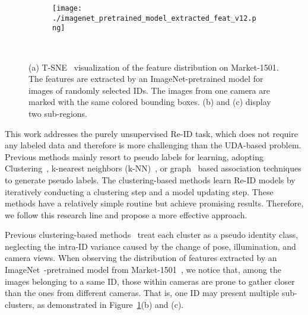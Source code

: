 \documentclass[letterpaper]{article} \usepackage{aaai21}  \usepackage{times}  \usepackage{helvet} \usepackage{courier}  \usepackage[hyphens]{url}  \usepackage{graphicx} \usepackage{subcaption}
\begin{document}
\begin{figure}[t]
\centering
\begin{subfigure}{0.36\textwidth}
\centering
\texttt{[image: ./imagenet\_pretrained\_model\_extracted\_feat\_v12.png]} 
\caption{}
\end{subfigure}
\\
\begin{subfigure}{0.144\textwidth}
\centering
{}
\caption{}
\end{subfigure}
\quad
\begin{subfigure}{0.117\textwidth}
\centering
{}
\caption{}
\end{subfigure}
\caption{(a) T-SNE~\cite{vanDerMaaten2008} visualization of the feature distribution on Market-1501. The features are extracted by an ImageNet-pretrained model for images of  randomly selected IDs. The images from one camera are marked with the same colored bounding boxes. (b) and (c) display two sub-regions.}
\label{fig_intro}
\end{figure}


This work addresses the purely unsupervised Re-ID task, which does not require any labeled data and therefore is more challenging than the UDA-based problem. Previous methods mainly resort to pseudo labels for learning, adopting Clustering~\cite{lin2019aBottom,zeng2020hierarchical}, k-nearest neighbors (k-NN)~\cite{li2018unsupervised,chen2018deepa}, or graph~\cite{ye2017dynamic,wu2019graph} based association techniques to generate pseudo labels. The clustering-based methods learn Re-ID models by iteratively conducting a clustering step and a model updating step. These methods have a relatively simple routine but achieve promising results. Therefore, we follow this research line and propose a more effective approach.  



Previous clustering-based methods~\cite{lin2019aBottom,zeng2020hierarchical,unsup_clustering,zhai2020ad} treat each cluster as a pseudo identity class, neglecting the intra-ID variance caused by the change of pose, illumination, and camera views. When observing the distribution of features extracted by an ImageNet~\cite{krizhevsky2012imagenet}-pretrained model from Market-1501~\cite{7410490}, we notice that, among the images belonging to a same ID, those within cameras are prone to gather closer than the ones from different cameras. That is, one ID may present multiple sub-clusters, as demonstrated in Figure~\ref{fig_intro}(b) and (c).
\end{document}
